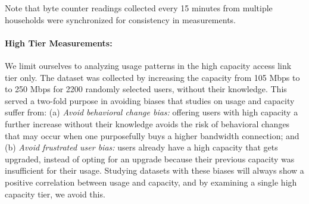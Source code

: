 Note that byte counter readings collected every 15 minutes from multiple households were synchronized for consistency in measurements.



\paragraph{High Tier Measurements:} We limit ourselves to analyzing usage patterns in the high capacity access link tier only. The \test dataset was collected by increasing the capacity from 105 Mbps to to 250 Mbps for 2200 randomly selected users, without their knowledge. This served a two-fold purpose in avoiding biases that studies on usage and capacity suffer from: (a) \emph{Avoid behavioral change bias:} offering users with high capacity a further increase without their knowledge avoids the risk of behavioral changes that may occur when one purposefully buys a higher bandwidth connection; and (b) \emph{Avoid frustrated user bias:} users already have a high capacity that gets upgraded, instead of opting for an upgrade because their previous capacity was insufficient for their usage. Studying datasets with these biases will always show a positive correlation between usage and capacity, and by examining a single high capacity tier, we avoid this.



